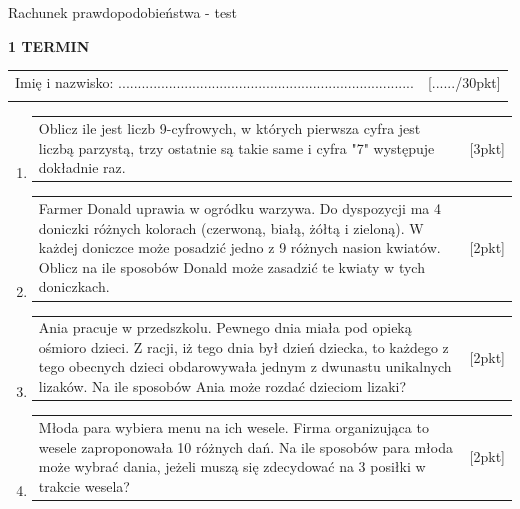 \documentclass[12pt,a4paper]{article}
\begin{document}
	\begin{center}
		\LARGE Rachunek prawdopodobieństwa - test
	\end{center}
	\vspace{1.5cm}
	\begin{flushright}
		\textbf{1 TERMIN}
	\end{flushright}
	\begin{tabular}{p{13cm} r}
		Imię i nazwisko: ............................................................................
		&[....../30pkt]\\ 
		\vspace{0.5cm}
	\end{tabular}
	\begin{enumerate}[1.]
		\item  \begin{tabular}{p{13cm} r}
			Oblicz ile jest liczb 9-cyfrowych, w których pierwsza cyfra jest liczbą parzystą, trzy ostatnie są takie same i cyfra "7" występuje dokładnie raz. &[3pkt]\\ 
		\end{tabular}
		
		\item  \begin{tabular}{p{13cm} r}
			Farmer Donald uprawia w ogródku warzywa. Do dyspozycji ma 4 doniczki różnych kolorach (czerwoną, białą, żółtą i zieloną). W każdej doniczce może posadzić jedno z 9 różnych nasion kwiatów. Oblicz na ile sposobów Donald może zasadzić te kwiaty w tych doniczkach.  &[2pkt]\\ 
		\end{tabular}
	
		\item  \begin{tabular}{p{13cm} r}
			Ania pracuje w przedszkolu. Pewnego dnia miała pod opieką ośmioro dzieci. Z racji, iż tego dnia był dzień dziecka, to każdego z tego obecnych dzieci obdarowywała jednym z dwunastu unikalnych lizaków. Na ile sposobów Ania może rozdać dzieciom lizaki?  &[2pkt]\\ 
		\end{tabular}
	
		\item \begin{tabular}{p{13cm} r}
			Młoda para wybiera menu na ich wesele. Firma organizująca to wesele zaproponowała 10 różnych dań. Na ile sposobów para młoda może wybrać dania, jeżeli muszą się zdecydować na 3 posiłki w trakcie wesela?	  &[2pkt]\\ 
		\end{tabular}
	

\end{enumerate}
\end{document}
